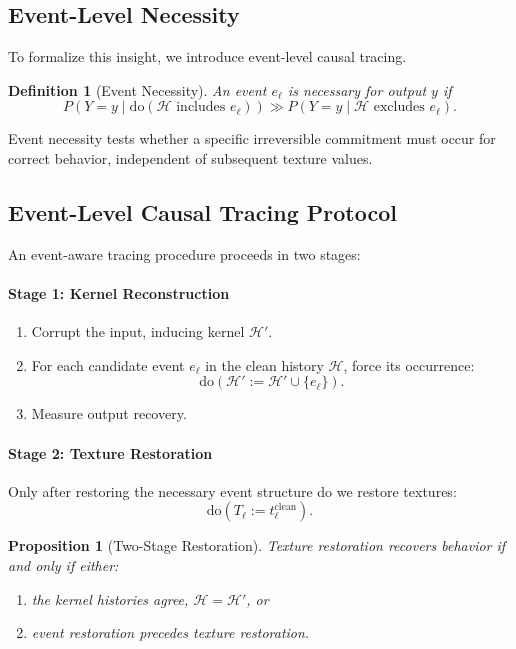 \documentclass[11pt]{article}
\newtheorem{definition}{Definition}
\newtheorem{proposition}{Proposition}
\theoremstyle{remark}
\newcommand{\Hist}{\mathcal{H}}
\newcommand{\Do}{\mathrm{do}}
\begin{document}
\subsection{Event-Level Necessity}

To formalize this insight, we introduce event-level causal tracing.

\begin{definition}[Event Necessity]
An event $e_\ell$ is necessary for output $y$ if
\[
P(Y = y \mid \Do(\Hist \text{ includes } e_\ell)) \gg
P(Y = y \mid \Hist \text{ excludes } e_\ell).
\]
\end{definition}

Event necessity tests whether a specific irreversible commitment must
occur for correct behavior, independent of subsequent texture values.

\subsection{Event-Level Causal Tracing Protocol}

An event-aware tracing procedure proceeds in two stages:

\paragraph{Stage 1: Kernel Reconstruction}
\begin{enumerate}
\item Corrupt the input, inducing kernel $\Hist'$.
\item For each candidate event $e_\ell$ in the clean history $\Hist$,
force its occurrence:
\[
\Do(\Hist' := \Hist' \cup \{e_\ell\}).
\]
\item Measure output recovery.
\end{enumerate}

\paragraph{Stage 2: Texture Restoration}
Only after restoring the necessary event structure do we restore
textures:
\[
\Do(T_\ell := t_\ell^{\text{clean}}).
\]

\begin{proposition}[Two-Stage Restoration]
Texture restoration recovers behavior if and only if either:
\begin{enumerate}
\item the kernel histories agree, $\Hist = \Hist'$, or
\item event restoration precedes texture restoration.
\end{enumerate}
\end{proposition}
\end{document}
